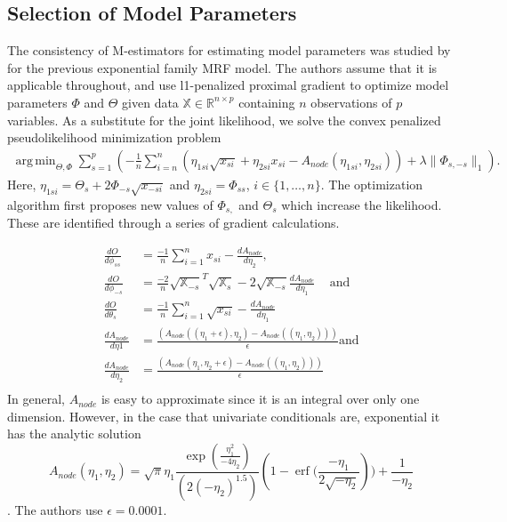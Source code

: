 \documentclass{samkoelleprelimworking}
\DeclareMathOperator\erf{erf}
\DeclareMathOperator*{\argmin}{arg\,min}
\begin{document}
\subsection{Selection of Model Parameters} \label{Optimization}

The consistency of M-estimators for estimating model parameters was studied by \citep{Yang2013-wa} for the previous exponential family MRF model.  The authors assume that it is applicable throughout, and use l1-penalized proximal gradient to optimize model parameters $\Phi$ and $\Theta$ given data $\mathbb{X} \in \mathbb{R}^{n\times p}$ containing $n$ observations of $p$ variables.  As a substitute for the joint likelihood, we solve the convex penalized pseudolikelihood minimization problem
\begin{align}
 \argmin_{\Theta, \Phi} \sum_{s = 1}^{p} (-\frac{1}{n} \sum_{i = n}^n (\eta_{1si} \sqrt{x_{si}} + \eta_{2si} x_{si} - A_{node} ( \eta_{1si}, \eta_{2si} )) + \lambda\| \Phi_{s,-s} \|_1).
 \end{align}
Here, $\eta_{1si} = \Theta_s + 2 \Phi_{-s}\sqrt{x_{-si}}$ and $\eta_{2si} = \Phi_{ss}$, $i \in \{1,\dotsc, n\}$.  The optimization algorithm first proposes new values of $\Phi_{s,}$ and $\Theta_s$ which increase the likelihood.  These are identified through a series of gradient calculations.  

\begin{align*}
\frac{dO}{d\phi_{ss}} &= \frac{-1}{n} \sum_{i=1}^{n} x_{si} - \frac{dA_{node}}{d\eta_2}, \\
\frac{dO}{d\phi_{-s}} &= \frac{-2}{n} \sqrt{\mathbb{X}_{-s}}^T \sqrt{\mathbb{X}_s} - 2 \sqrt{\mathbb{X}_{-s}} \frac{dA_{node}}{d\eta_1}\, \quad \text{and}  \\
\frac{dO}{d\theta_{s}} &= \frac{-1}{n} \sum_{i=1}^{n} \sqrt{x_{si}} - \frac{dA_{node}}{d\eta_1} \\
\frac{dA_{node}}{d\eta1} &= \frac{(A_{node}((\eta_1 + \epsilon), \eta_2) - A_{node}((\eta_1 , \eta_2)))}{\epsilon} \text{and} \\
\frac{dA_{node}}{d\eta_2} &= \frac{(A_{node}(\eta_1 , \eta_2+ \epsilon) - A_{node}((\eta_1 , \eta_2)))}{\epsilon} \\ 
\end{align*}
In general, $A_{node}$ is easy to approximate since it is an integral over only one dimension. However, in the case that univariate conditionals are, exponential it has the analytic solution
\[A_{node} (\eta_1, \eta_2) = \sqrt{\pi}  \eta_1 \frac{\exp{ ( \frac{\eta_1^2}{-4\eta_2} ) }} { (2(-\eta_2)^{1.5})} (1 - \erf{(\frac{-\eta_1}{2 \sqrt{ -\eta_2}}}))  + \frac{1}{-\eta_2}\].
The authors use $\epsilon = 0.0001$.
\end{document}
